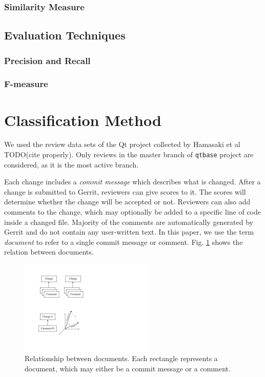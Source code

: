 \documentclass[conference]{IEEEtran}
\begin{document}
\subsubsection{Similarity Measure}
\subsection{Evaluation Techniques}
\subsubsection{Precision and Recall}
\subsubsection{F-measure}


\section{Classification Method}

We used the review data sets of the Qt project collected by Hamasaki et al TODO(cite properly).
Only reviews in the master branch of \texttt{qtbase} project are considered,
as it is the most active branch.

Each change includes a \emph{commit message} which describes what is changed.
After a change is submitted to Gerrit, reviewers can give scores to it.
The scores will determine whether the change will be accepted or not.
Reviewers can also add comments to the change, which may optionally be added to a specific line of code inside a changed file.
Majority of the comments are automatically generated by Gerrit and do not contain any user-written text.
In this paper, we use the term \emph{document} to refer to a single commit message or comment.
Fig. \ref{fig:hierarchy} shows the relation between documents.

\begin{figure}[h]
\centering
\includegraphics[width=2.5in]{hierarchy}
\caption{Relationship between documents.
Each rectangle represents a document, which may either be a commit message or a comment.}
\label{fig:hierarchy}
\end{figure}
\end{document}
